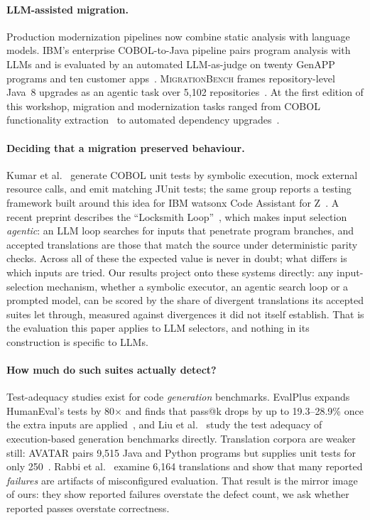 \documentclass[sigconf]{acmart}
\begin{document}
\paragraph{LLM-assisted migration.}
Production modernization pipelines now combine static analysis with language models. IBM's
enterprise COBOL-to-Java pipeline pairs program analysis with LLMs and is evaluated by an
automated LLM-as-judge on twenty GenAPP programs and ten customer
apps~\cite{chakravarthy2026enterprise}. \textsc{MigrationBench} frames repository-level
Java~8 upgrades as an agentic task over 5,102 repositories~\cite{liu2025migrationbench}. At the
first edition of this workshop, migration and modernization tasks ranged from COBOL functionality
extraction~\cite{rajbhoj2025cobol} to automated dependency upgrades~\cite{tawosi2025dependency}.

\paragraph{Deciding that a migration preserved behaviour.}
Kumar et
al.~\cite{kumar2024validation} generate COBOL unit tests by symbolic execution, mock external
resource calls, and emit matching JUnit tests; the same group reports a testing framework built
around this idea for IBM watsonx Code Assistant for Z~\cite{hans2025testing}. A recent preprint
describes the ``Locksmith Loop''~\cite{ferenczi2026locksmith}, which makes input selection
\emph{agentic}: an LLM
loop searches for inputs that penetrate program branches, and accepted translations are those
that match the source under deterministic parity checks. Across all of these the expected value
is never in doubt; what differs is which inputs are tried. Our results
project onto these systems directly: any input-selection mechanism, whether a symbolic
executor, an agentic search loop or a prompted model, can be scored by the share of divergent
translations its accepted suites let through, measured against divergences it did not itself
establish. That is the evaluation this paper applies to LLM selectors, and nothing in its
construction is specific to LLMs.

\paragraph{How much do such suites actually detect?}
Test-adequacy studies exist for code \emph{generation} benchmarks. EvalPlus expands HumanEval's
tests by 80$\times$ and finds that pass@k drops by up to 19.3--28.9\% once the extra inputs are
applied~\cite{liu2023evalplus}, and Liu et al.~\cite{liu2025adequacy} study the test adequacy of
execution-based generation benchmarks directly. Translation corpora are weaker still: AVATAR
pairs 9,515 Java and Python programs but supplies unit tests for only
250~\cite{ahmad2021avatar}. Rabbi et al.~\cite{rabbi2026beyond} examine 6,164 translations and
show that many reported \emph{failures} are artifacts of misconfigured evaluation. That result is
the mirror image of ours: they show reported failures overstate the defect count, we ask whether
reported passes overstate correctness.
\end{document}
